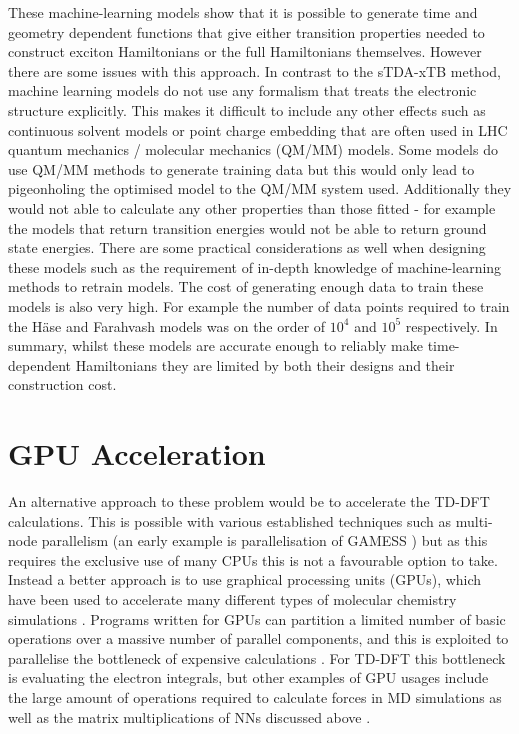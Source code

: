 These machine-learning models show that it is possible to generate time and geometry
dependent functions that give either transition properties needed to construct exciton
Hamiltonians or the full Hamiltonians themselves. However there are some issues 
with this approach. In contrast to the sTDA-xTB method, machine learning models 
do not use any formalism that treats the electronic structure explicitly. This makes 
it difficult to include any other effects such as continuous solvent models or point
charge embedding that are often used in LHC quantum mechanics / molecular mechanics
(QM/MM) models. Some models do use QM/MM methods to generate training data but this
would only lead to pigeonholing the optimised model to the QM/MM system used. Additionally
they would not able to calculate any other properties than those fitted - for example
the models that return \Qy transition energies would not be able to return ground
state energies. There are some practical considerations as well when designing these
models such as the requirement of in-depth knowledge of machine-learning methods 
to retrain models. The cost of generating enough data to train these models is also
very high. For example the number of data points required to train the H\"{a}se and
Farahvash models was on the order of $10^4$ and $10^5$ respectively. In summary,
whilst these models are accurate enough to reliably make time-dependent Hamiltonians 
they are limited by both their designs and their construction cost.

\section{GPU Acceleration}
\label{sec:gpu_acceleration}

An alternative approach to these problem would be to accelerate the TD-DFT calculations.
This is possible with various established techniques such as multi-node parallelism
(an early example is parallelisation of GAMESS \cite{Fletcher2000}) but as this 
requires the exclusive use of many CPUs this is not a favourable option to take.
Instead a better approach is to use graphical processing units (GPUs), which have
been used to accelerate many different types of molecular chemistry simulations \cite{Pandey2022}. 
Programs written for GPUs can partition a limited number of basic operations over 
a massive number of parallel components, and this is exploited to parallelise the
bottleneck of expensive calculations \cite{McIntosh-Smith2013}. For TD-DFT this 
bottleneck is evaluating the electron integrals, but other examples of GPU usages 
include the large amount of operations required to calculate forces in MD simulations 
as well as the matrix multiplications of NNs discussed above \cite{Ufimtsev2008, Friedrichs2009, Wu2012}.

